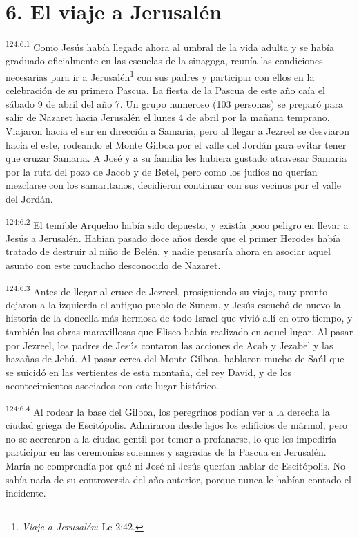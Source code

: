 \section*{6. El viaje a Jerusalén}
\par
\textsuperscript{124:6.1} Como Jesús había llegado ahora al umbral de la vida adulta y se había graduado oficialmente en las escuelas de la sinagoga, reunía las condiciones necesarias para ir a Jerusalén\footnote{\textit{Viaje a Jerusalén}: Lc 2:42.} con sus padres y participar con ellos en la celebración de su primera Pascua. La fiesta de la Pascua de este año caía el sábado 9 de abril del año 7. Un grupo numeroso (103 personas) se preparó para salir de Nazaret hacia Jerusalén el lunes 4 de abril por la mañana temprano. Viajaron hacia el sur en dirección a Samaria, pero al llegar a Jezreel se desviaron hacia el este, rodeando el Monte Gilboa por el valle del Jordán para evitar tener que cruzar Samaria. A José y a su familia les hubiera gustado atravesar Samaria por la ruta del pozo de Jacob y de Betel, pero como los judíos no querían mezclarse con los samaritanos, decidieron continuar con sus vecinos por el valle del Jordán.

\par
\textsuperscript{124:6.2} El temible Arquelao había sido depuesto, y existía poco peligro en llevar a Jesús a Jerusalén. Habían pasado doce años desde que el primer Herodes había tratado de destruir al niño de Belén, y nadie pensaría ahora en asociar aquel asunto con este muchacho desconocido de Nazaret.

\par
\textsuperscript{124:6.3} Antes de llegar al cruce de Jezreel, prosiguiendo su viaje, muy pronto dejaron a la izquierda el antiguo pueblo de Sunem, y Jesús escuchó de nuevo la historia de la doncella más hermosa de todo Israel que vivió allí en otro tiempo, y también las obras maravillosas que Eliseo había realizado en aquel lugar. Al pasar por Jezreel, los padres de Jesús contaron las acciones de Acab y Jezabel y las hazañas de Jehú. Al pasar cerca del Monte Gilboa, hablaron mucho de Saúl que se suicidó en las vertientes de esta montaña, del rey David, y de los acontecimientos asociados con este lugar histórico.

\par
\textsuperscript{124:6.4} Al rodear la base del Gilboa, los peregrinos podían ver a la derecha la ciudad griega de Escitópolis. Admiraron desde lejos los edificios de mármol, pero no se acercaron a la ciudad gentil por temor a profanarse, lo que les impediría participar en las ceremonias solemnes y sagradas de la Pascua en Jerusalén. María no comprendía por qué ni José ni Jesús querían hablar de Escitópolis. No sabía nada de su controversia del año anterior, porque nunca le habían contado el incidente.


